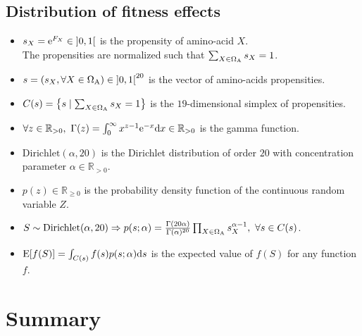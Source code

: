\subsection{Distribution of fitness effects}
\begin{itemize}
	\item $s_X = \mathrm{e}^{F_X} \in \left]0,1\right[ $ is the propensity of amino-acid $X$.\\
	The propensities are normalized such that $\sum_{X \in \Omega_{\mathrm{A}}}s_X = 1 $.
	\item $s = \left( s_X , \forall X \in \Omega_{\mathrm{A}} \right) \in \left]0,1\right[^{20} $ is the vector of amino-acids propensities.
	\item $C(s) = \left\{ s \mid \sum_{X \in \Omega_{\mathrm{A}}} s_X = 1  \right\} $ is the $19$-dimensional simplex of propensities.
	\item $\forall z \in \mathbb{R}_{>0}, \ \Gamma(z) = \int_{0}^{\infty} x^{z-1} \e^{-x} \der x \in \mathbb{R}_{>0} $ is the gamma function.
	\item $\mathrm{Dirichlet}(\alpha, 20)$ is the Dirichlet distribution of order $20$ with concentration parameter $\alpha \in \mathbb{R}_{>0}$.
	\item $p(z) \in \mathbb{R}_{\geq 0}$ is the probability density function of the continuous random variable $Z$.
	\item $S \sim \mathrm{Dirichlet}(\alpha, 20) \Rightarrow	p(s; \alpha) = {\frac {\Gamma (20 \alpha)}{\Gamma (\alpha )^{20}}} \prod_{X \in \Omega_{\mathrm{A}}} s_X^{\alpha-1}, \ \forall s \in C(s)$.
	\item $\operatorname{E}[f(S)] = \int_{C(s)} f(s) p(s; \alpha) \mathrm{d} s$ is the expected value of $f(S)$ for any function $f$.
\end{itemize}

\section{Summary}

